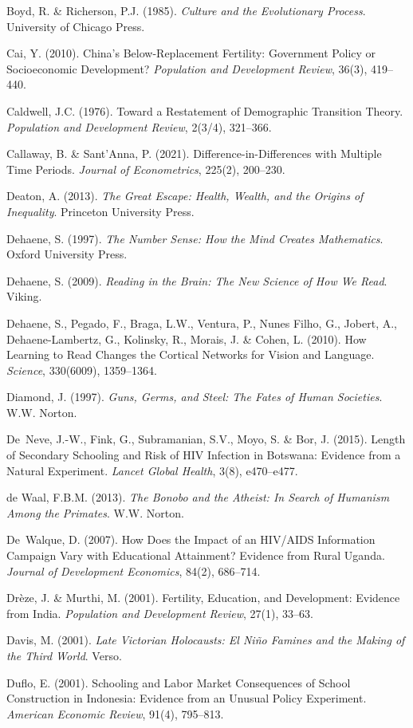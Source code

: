 \documentclass[12pt,letterpaper]{article}
\begin{document}
Boyd, R. \& Richerson, P.J. (1985). \emph{Culture and the Evolutionary
Process}. University of Chicago Press.

Cai, Y. (2010). China's Below-Replacement Fertility: Government Policy
or Socioeconomic Development? \emph{Population and Development Review},
36(3), 419--440.

Caldwell, J.C. (1976). Toward a Restatement of Demographic Transition
Theory. \emph{Population and Development Review}, 2(3/4), 321--366.

Callaway, B. \& Sant'Anna, P. (2021). Difference-in-Differences with
Multiple Time Periods. \emph{Journal of Econometrics}, 225(2), 200--230.

Deaton, A. (2013). \emph{The Great Escape: Health, Wealth, and the
Origins of Inequality}. Princeton University Press.

Dehaene, S. (1997). \emph{The Number Sense: How the Mind Creates
Mathematics}. Oxford University Press.

Dehaene, S. (2009). \emph{Reading in the Brain: The New Science of
How We Read}. Viking.

Dehaene, S., Pegado, F., Braga, L.W., Ventura, P., Nunes Filho, G.,
Jobert, A., Dehaene-Lambertz, G., Kolinsky, R., Morais, J. \& Cohen, L.
(2010). How Learning to Read Changes the Cortical Networks for Vision and
Language. \emph{Science}, 330(6009), 1359--1364.

Diamond, J. (1997). \emph{Guns, Germs, and Steel: The Fates of Human
Societies}. W.W. Norton.

De~Neve, J.-W., Fink, G., Subramanian, S.V., Moyo, S. \& Bor, J.
(2015). Length of Secondary Schooling and Risk of HIV Infection in
Botswana: Evidence from a Natural Experiment. \emph{Lancet Global
Health}, 3(8), e470--e477.

de Waal, F.B.M. (2013). \emph{The Bonobo and the Atheist: In Search
of Humanism Among the Primates}. W.W. Norton.

De~Walque, D. (2007). How Does the Impact of an HIV/AIDS Information
Campaign Vary with Educational Attainment? Evidence from Rural Uganda.
\emph{Journal of Development Economics}, 84(2), 686--714.

Drèze, J. \& Murthi, M. (2001). Fertility, Education, and Development:
Evidence from India. \emph{Population and Development Review}, 27(1),
33--63.

Davis, M. (2001). \emph{Late Victorian Holocausts: El Niño Famines and
the Making of the Third World}. Verso.

Duflo, E. (2001). Schooling and Labor Market Consequences of School
Construction in Indonesia: Evidence from an Unusual Policy Experiment.
\emph{American Economic Review}, 91(4), 795--813.
\end{document}
